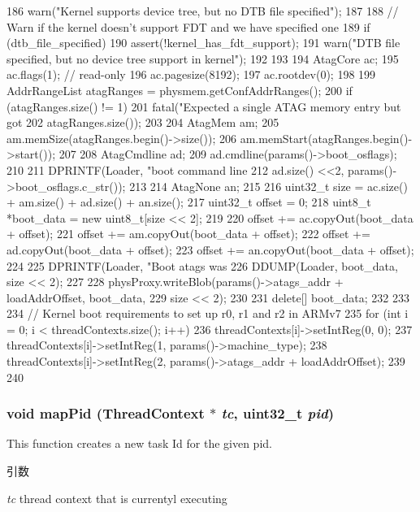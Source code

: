 \begin{DoxyCode}
{{{186             warn("Kernel supports device tree, but no DTB file specified\n");
187         }
188         // Warn if the kernel doesn't support FDT and we have specified one
189         if (dtb_file_specified) {
190             assert(!kernel_has_fdt_support);
191             warn("DTB file specified, but no device tree support in kernel\n");
192         }
193 
194         AtagCore ac;
195         ac.flags(1); // read-only
196         ac.pagesize(8192);
197         ac.rootdev(0);
198 
199         AddrRangeList atagRanges = physmem.getConfAddrRanges();
200         if (atagRanges.size() != 1) {
201             fatal("Expected a single ATAG memory entry but got %
202                   atagRanges.size());
203         }
204         AtagMem am;
205         am.memSize(atagRanges.begin()->size());
206         am.memStart(atagRanges.begin()->start());
207 
208         AtagCmdline ad;
209         ad.cmdline(params()->boot_osflags);
210 
211         DPRINTF(Loader, "boot command line %
212                 ad.size() <<2, params()->boot_osflags.c_str());
213 
214         AtagNone an;
215 
216         uint32_t size = ac.size() + am.size() + ad.size() + an.size();
217         uint32_t offset = 0;
218         uint8_t *boot_data = new uint8_t[size << 2];
219 
220         offset += ac.copyOut(boot_data + offset);
221         offset += am.copyOut(boot_data + offset);
222         offset += ad.copyOut(boot_data + offset);
223         offset += an.copyOut(boot_data + offset);
224 
225         DPRINTF(Loader, "Boot atags was %
226         DDUMP(Loader, boot_data, size << 2);
227 
228         physProxy.writeBlob(params()->atags_addr + loadAddrOffset, boot_data,
229                 size << 2);
230 
231         delete[] boot_data;
232     }
233 
234     // Kernel boot requirements to set up r0, r1 and r2 in ARMv7
235     for (int i = 0; i < threadContexts.size(); i++) {
236         threadContexts[i]->setIntReg(0, 0);
237         threadContexts[i]->setIntReg(1, params()->machine_type);
238         threadContexts[i]->setIntReg(2, params()->atags_addr + loadAddrOffset);
239     }
240 }
\end{DoxyCode}
\hypertarget{classLinuxArmSystem_a7126cba24850188b3f0e08beec5e95d8}{
\subsubsection[{mapPid}]{\setlength{\rightskip}{0pt plus 5cm}void mapPid ({\bf ThreadContext} $\ast$ {\em tc}, \/  {\bf uint32\_\-t} {\em pid})}}
\label{classLinuxArmSystem_a7126cba24850188b3f0e08beec5e95d8}
This function creates a new task Id for the given pid. 
\begin{DoxyParams}{引数}
\item[{\em tc}]thread context that is currentyl executing \end{DoxyParams}



